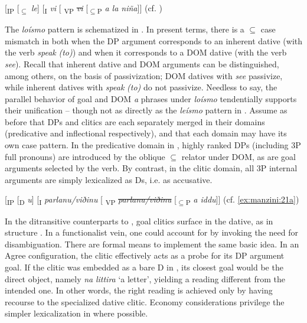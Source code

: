 \documentclass[output=paper,colorlinks,citecolor=brown,nonflat]{./langscibook}
\begin{document}
\ea%
    \label{ex:manzini:25}{}
    [\textsubscript{IP} [\textsubscript{${\subseteq}$} \textit{le}]  [\textsubscript{I} \textit{vi}   [\textsubscript{ VP} \sout{\textit{vi}}  [\textsubscript{${\subseteq}$P} \textit{a la niña}]]    \hfill (cf. )\\
\z

The \textit{loísmo} pattern is schematized in . In present terms, there is a ${\subseteq}$ case mismatch in  both when the DP argument corresponds to an inherent dative (with the verb \textit{speak} \textit{(to)}) and when it corresponds to a DOM dative (with the verb \textit{see}). Recall that inherent dative and DOM arguments can be distinguished, among others, on the basis of passivization; DOM datives with \textit{see} passivize, while inherent datives with \textit{speak} \textit{(to)} do not passivize. Needless to say, the parallel behavior of goal and DOM \textit{a} phrases under \textit{loísmo} tendentially supports their unification – though not as directly as the \textit{leísmo} pattern in . Assume as before that DPs and clitics are each separately merged in their domains (predicative and inflectional respectively), and that each domain may have its own case pattern. In the predicative domain in , highly ranked DPs (including 3P full pronouns) are introduced by the oblique ${\subseteq}$ relator under DOM, as are goal arguments selected by the verb. By contrast, in the clitic domain, all 3P internal arguments are simply lexicalized as Ds, i.e. as accusative.

\ea%
    \label{ex:manzini:26}{}
    [\textsubscript{IP} [\textsubscript{D} \textit{u}] [\textsubscript{I} \textit{parlanu/viðinu}   [\textsubscript{ VP} \sout{\textit{parlanu/viðinu}} [\textsubscript{${\subseteq}$P} \textit{a iddu}]]              \hfill (cf. \ref{ex:manzini:21a})
\z

In the ditransitive counterparts to , goal clitics surface in the dative, as in structure . In a functionalist vein, one could account for  by invoking the need for disambiguation. There are formal means to implement the same basic idea. In an Agree configuration, the clitic effectively acts as a probe for its DP argument goal. If the clitic was embedded as a bare D in , its closest goal would be the direct object, namely \textit{na} \textit{littira} ‘a letter’, yielding a reading different from the intended one. In other words, the right reading is achieved only by having recourse to the specialized dative clitic. Economy considerations privilege the simpler lexicalization in  where possible.
\end{document}

